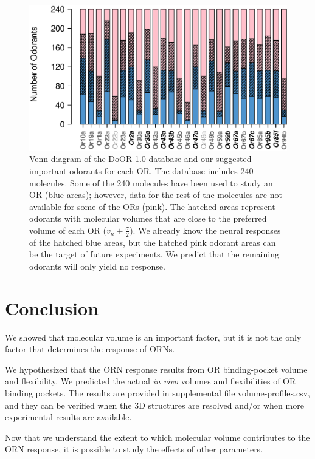 \documentclass[fleqn,11pt]{wlscirep}
\begin{document}
\begin{figure}
\centering
	\includegraphics[width=\textwidth]{odorant-suggest}
	\caption{Venn diagram of the DoOR 1.0 database and our suggested important odorants for each OR.
			The database includes 240 molecules. 
			Some of the 240 molecules have been used to study an OR (blue areas); however, 
			data for the rest of the molecules are not available for some of the ORs (pink).
			The hatched areas represent odorants with molecular volumes that are close to the preferred volume of each OR
			($v_n \pm \frac{\sigma}{2}$).
			We already know the neural responses of the hatched blue areas, 
			but the hatched pink odorant areas can be the target of future experiments. We predict that the remaining odorants will only yield no response.
			}
	\label{fig:odorant-suggest}
\end{figure}

\section*{Conclusion}

We showed that molecular volume is an important factor, 
but it is not the only factor that determines the response of ORNs. 

We hypothesized that the ORN response results from OR binding-pocket volume and flexibility. 
We predicted the actual \textit{in vivo} volumes and flexibilities of OR binding pockets. 
The results are provided in supplemental file volume-profiles.csv, and they can be verified when the 3D structures are resolved 
and/or when more experimental results are available. 

Now that we understand the extent to which molecular volume contributes to the ORN response, it is possible to study the effects of other parameters.
\end{document}
